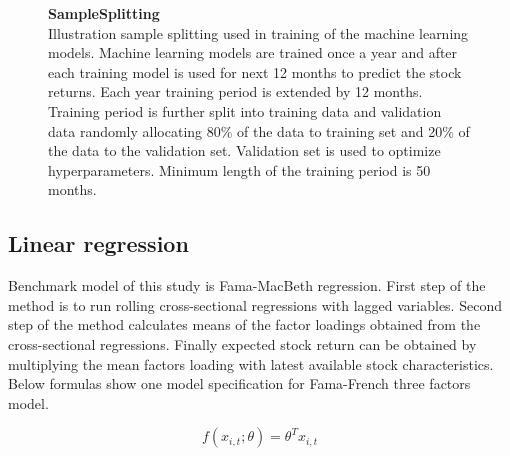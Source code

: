\documentclass{article}
\begin{document}
\begin{figure}[h]
\centering
\caption[SampleSplitting]{\textbf{SampleSplitting}\\ Illustration sample splitting used in training of the machine learning models. Machine learning models are trained once a year and after each training model is used for next 12 months to predict the stock returns. Each year training period is extended by 12 months. Training period is further split into training data and validation data randomly allocating 80\% of the data to training set and 20\% of the data to the validation set. Validation set is used to optimize hyperparameters. Minimum length of the training period is 50 months.}
\label{plot:Turnover}
\end{figure}

\subsection{Linear regression}
Benchmark model of this study is Fama-MacBeth \citeyear{FamaMacBeth1973} regression. First step of the method is to run rolling cross-sectional regressions with lagged variables. Second step of the method calculates means of the factor loadings obtained from the cross-sectional regressions. Finally expected stock return can be obtained by multiplying the mean factors loading with latest available stock characteristics. Below formulas show one model specification for Fama-French \citeyear{FAMA19933} three factors model.

\begin{equation}
f(x_{i, t}; \theta) = \theta^T x_{i, t}
\end{equation}
\end{document}

